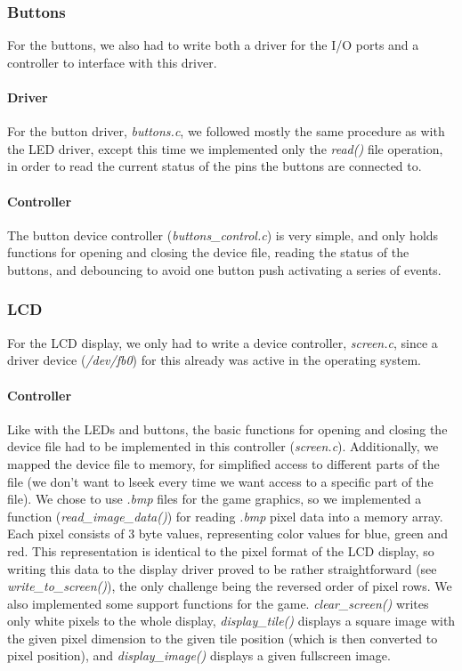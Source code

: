 \documentclass[a4paper,11pt]{article}
\begin{document}
\subsubsection{Buttons}
For the buttons, we also had to write both a driver for the I/O ports and a controller to interface with this driver.
\paragraph{Driver} For the button driver, \textit{buttons.c}, we followed mostly the same procedure as with the LED driver, except this time we implemented only the \textit{read()} file operation, in order to read the current status of the pins the buttons are connected to.
\paragraph{Controller} The button device controller (\textit{buttons\_control.c}) is very simple, and only holds functions for opening and closing the device file, reading the status of the buttons, and debouncing to avoid one button push activating a series of events.


\subsubsection{LCD} 
\label{sec:lcd}
For the LCD display, we only had to write a device controller, \textit{screen.c}, since a driver device (\textit{/dev/fb0}) for this already was active in the operating system. 
\paragraph{Controller} Like with the LEDs and buttons, the basic functions for opening and closing the device file had to be implemented in this controller (\textit{screen.c}). Additionally, we mapped the device file to memory, for simplified access to different parts of the file (we don't want to lseek every time we want access to a specific part of the file). We chose to use \textit{.bmp} files for the game graphics, so we implemented a function (\textit{read\_image\_data()}) for reading \textit{.bmp} pixel data into a memory array. Each pixel consists of 3 byte values, representing color values for blue, green and red. This representation is identical to the pixel format of the LCD display, so writing this data to the display driver proved to be rather straightforward (see \textit{write\_to\_screen()}), the only challenge being the reversed order of pixel rows. We also implemented some support functions for the game. \textit{clear\_screen()} writes only white pixels to the whole display, \textit{display\_tile()} displays a square image with the given pixel dimension to the given tile position (which is then converted to pixel position), and \textit{display\_image()} displays a given fullscreen image.
\end{document}
